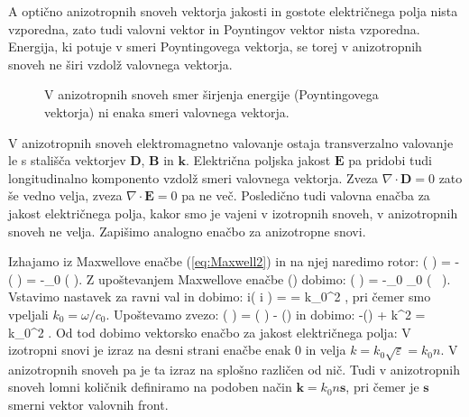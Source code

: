 A optično anizotropnih snoveh vektorja jakosti in gostote električnega polja nista vzporedna, zato tudi 
valovni vektor in Poyntingov vektor nista vzporedna. Energija, ki potuje v smeri Poyntingovega vektorja, se
torej v anizotropnih snoveh ne širi vzdolž valovnega vektorja. 
\begin{figure}[!h]
\centering
\def\svgwidth{90truemm} 
%
\caption{V anizotropnih snoveh smer širjenja energije (Poyntingovega 
vektorja) ni enaka smeri valovnega vektorja.}
\label{fig:10_koti}
\end{figure}

V anizotropnih snoveh elektromagnetno valovanje ostaja transverzalno
valovanje le s stališča vektorjev $\mathbf{D}$, $\mathbf{B}$ in 
$\mathbf{k}$. Električna poljska jakost $\mathbf{E}$ pa pridobi 
tudi longitudinalno komponento vzdolž smeri valovnega vektorja. 
Zveza $\nabla \cdot \mathbf{D} = 0$ zato še vedno velja, zveza 
$\nabla \cdot \mathbf{E} = 0$ pa ne več. Posledično tudi valovna
enačba za jakost električnega polja, kakor smo je vajeni
v izotropnih snoveh, v anizotropnih snoveh ne velja. Zapišimo 
analogno enačbo za anizotropne snovi. 

Izhajamo iz Maxwellove enačbe (\ref{eq:Maxwell2}) in na njej naredimo rotor:
\beq
\nabla \times \left( \nabla \times {} \right) = -  
\left( \nabla \times {} \right) = -\mu_0  
\left( \nabla \times {} \right).
\label{eq:10_012}
\eeq
Z upoštevanjem Maxwellove enačbe () dobimo:
\beq
\nabla \times \left( \nabla \times {} \right) = -\mu_0 \varepsilon_0 
 \left( \underline{\varepsilon}\, \right).
\label{eq:10_013}
\eeq
Vstavimo nastavek za ravni val in dobimo:
\beq
i\times \left( i  \times {}\right) = 
\underline{\varepsilon}  = 
k_0^2 \underline{\varepsilon} ,
\label{eq:10_014}
\eeq
pri čemer smo vpeljali $k_0 = \omega / c_0$. Upoštevamo zvezo:
\beq
{}\times\left( \times {}\right) = \left(\cdot 
{}\right)  - \left(\cdot {}\right) 
\label{eq:10_015}
\eeq
in dobimo:
\beq
-\left(\cdot {}\right) + k^2  = 
k_0^2 \underline{\varepsilon} .
\label{eq:10_016}
\eeq
Od tod dobimo vektorsko enačbo za jakost električnega polja:
V izotropni snovi je izraz na desni strani enačbe enak 0 in velja $k = k_0\sqrt{\varepsilon} = k_0 n$. V anizotropnih
snoveh pa je ta izraz na splošno različen od nič. Tudi v anizotropnih snoveh lomni količnik
definiramo na podoben način $\mathbf{k}= k_0 n \mathbf{s}$, pri čemer je $\mathbf{s}$ smerni vektor
valovnih front.

